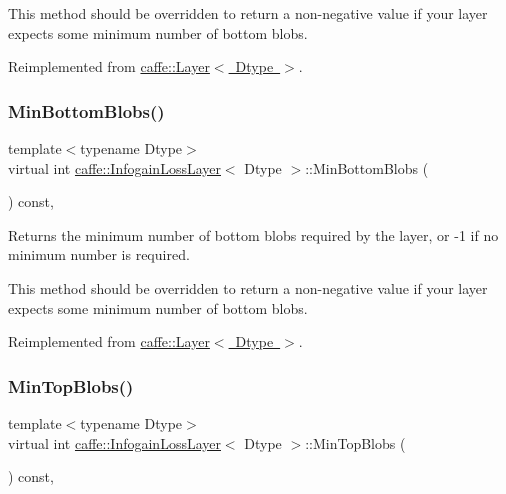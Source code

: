 This method should be overridden to return a non-\/negative value if your layer expects some minimum number of bottom blobs. 

Reimplemented from \mbox{\hyperlink{classcaffe_1_1_layer_aca3cb2bafaefda5d4760aaebd0b72def}{caffe\+::\+Layer$<$ Dtype $>$}}.

\mbox{\label{classcaffe_1_1_infogain_loss_layer_ad8a1ef702a695e379e5d0450369b4a0c}} 
\subsubsection{\texorpdfstring{Min\+Bottom\+Blobs()}{MinBottomBlobs()}\hspace{0.1cm}{\footnotesize\ttfamily [2/2]}}
{\footnotesize\ttfamily template$<$typename Dtype$>$ \\
virtual int \mbox{\hyperlink{classcaffe_1_1_infogain_loss_layer}{caffe\+::\+Infogain\+Loss\+Layer}}$<$ Dtype $>$\+::Min\+Bottom\+Blobs (\begin{DoxyParamCaption}{ }\end{DoxyParamCaption}) const\hspace{0.3cm}{\ttfamily [inline]}, {\ttfamily [virtual]}}



Returns the minimum number of bottom blobs required by the layer, or -\/1 if no minimum number is required. 

This method should be overridden to return a non-\/negative value if your layer expects some minimum number of bottom blobs. 

Reimplemented from \mbox{\hyperlink{classcaffe_1_1_layer_aca3cb2bafaefda5d4760aaebd0b72def}{caffe\+::\+Layer$<$ Dtype $>$}}.

\mbox{\label{classcaffe_1_1_infogain_loss_layer_a15c4916e5de27151eb745491d8d14d41}} 
\subsubsection{\texorpdfstring{Min\+Top\+Blobs()}{MinTopBlobs()}\hspace{0.1cm}{\footnotesize\ttfamily [1/2]}}
{\footnotesize\ttfamily template$<$typename Dtype$>$ \\
virtual int \mbox{\hyperlink{classcaffe_1_1_infogain_loss_layer}{caffe\+::\+Infogain\+Loss\+Layer}}$<$ Dtype $>$\+::Min\+Top\+Blobs (\begin{DoxyParamCaption}{ }\end{DoxyParamCaption}) const\hspace{0.3cm}{\ttfamily [inline]}, {\ttfamily [virtual]}}




